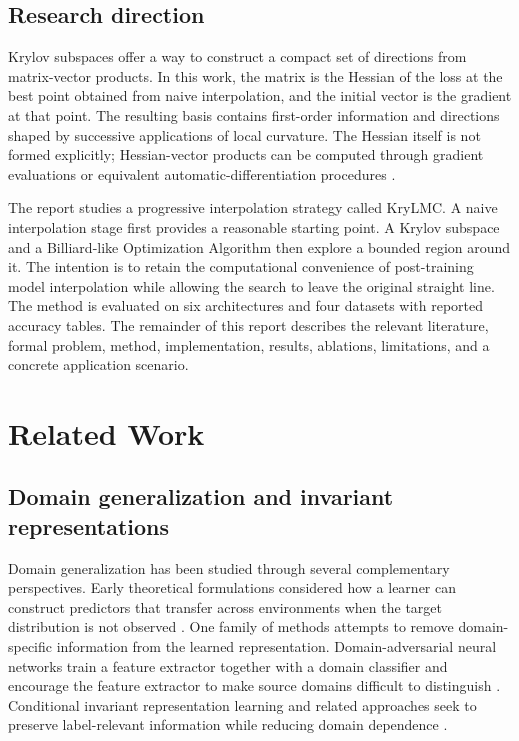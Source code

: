 \documentclass[11pt,a4paper]{article}
\begin{document}
\subsection{Research direction}
Krylov subspaces offer a way to construct a compact set of directions from matrix-vector products. In this work, the matrix is the Hessian of the loss at the best point obtained from naive interpolation, and the initial vector is the gradient at that point. The resulting basis contains first-order information and directions shaped by successive applications of local curvature. The Hessian itself is not formed explicitly; Hessian-vector products can be computed through gradient evaluations or equivalent automatic-differentiation procedures \cite{pearlmutter1994hessian,liesen2013krylov,vinyals2012krylov}.

The report studies a progressive interpolation strategy called KryLMC. A naive interpolation stage first provides a reasonable starting point. A Krylov subspace and a Billiard-like Optimization Algorithm then explore a bounded region around it. The intention is to retain the computational convenience of post-training model interpolation while allowing the search to leave the original straight line. The method is evaluated on six architectures and four datasets with reported accuracy tables. The remainder of this report describes the relevant literature, formal problem, method, implementation, results, ablations, limitations, and a concrete application scenario.

\section{Related Work}

\subsection{Domain generalization and invariant representations}
Domain generalization has been studied through several complementary perspectives. Early theoretical formulations considered how a learner can construct predictors that transfer across environments when the target distribution is not observed \cite{blanchard2011generalizing,muandet2013domain,bendavid2010theory}. One family of methods attempts to remove domain-specific information from the learned representation. Domain-adversarial neural networks train a feature extractor together with a domain classifier and encourage the feature extractor to make source domains difficult to distinguish \cite{ganin2016dann}. Conditional invariant representation learning and related approaches seek to preserve label-relevant information while reducing domain dependence \cite{li2018conditional,arjovsky2019irm}.
\end{document}
